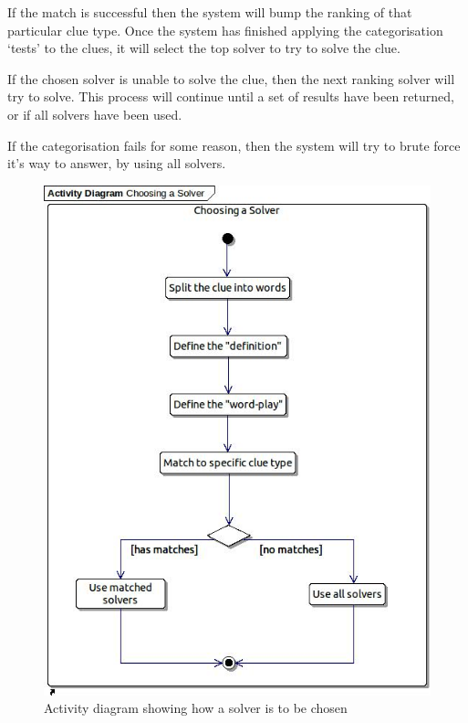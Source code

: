 If the match is successful then the system will bump the ranking of that 
particular clue type. Once the system has finished applying the categorisation 
`tests' to the clues, it will select the top solver to try to solve the clue.

If the chosen solver is unable to solve the clue, then the next ranking solver 
will try to solve. This process will continue until a set of results have been 
returned, or if all solvers have been used.

If the categorisation fails for some reason, then the system will try to brute 
force it's way to answer, by using all solvers.

\begin{figure}[H]
  \centering
  \includegraphics[scale=0.6]{design/activity/choosing_a_solver.jpg}
  \caption{Activity diagram showing how a solver is to be chosen}
  \label{fig:categorisation_activity}
\end{figure}


